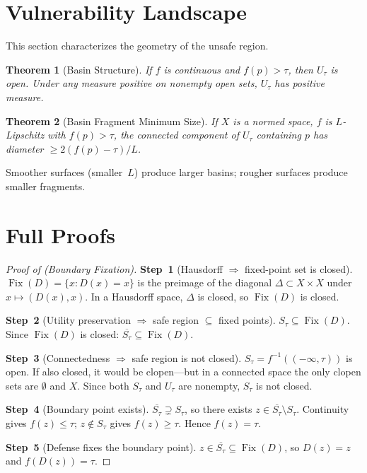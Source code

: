 \documentclass[11pt]{article}
\newtheorem{theorem}{Theorem}[section]
\newcommand{\cl}[1]{\overline{#1}}
\newcommand{\Fix}{\operatorname{Fix}}
\begin{document}
\section{Vulnerability Landscape}
\label{app:landscape}

This section characterizes the geometry of the unsafe region.

\begin{theorem}[Basin Structure]
\label{thm:basin}
If $f$ is continuous and $f(p)>\tau$, then $U_\tau$ is open. Under
any measure positive on nonempty open sets, $U_\tau$ has positive
measure.
\end{theorem}

\begin{theorem}[Basin Fragment Minimum Size]
\label{thm:fragment}
If $X$ is a normed space, $f$ is $L$-Lipschitz with $f(p) > \tau$,
the connected component of $U_\tau$ containing $p$ has diameter
$\geq 2(f(p) - \tau)/L$.
\end{theorem}

Smoother surfaces (smaller~$L$) produce larger basins; rougher
surfaces produce smaller fragments.

\section{Full Proofs}
\label{app:proofs}

\begin{proof}[Proof of  (Boundary Fixation)]
\textbf{Step~1} (Hausdorff $\Rightarrow$ fixed-point set is closed).
$\Fix(D) = \{x : D(x) = x\}$ is the preimage of the diagonal
$\Delta \subset X \times X$ under $x \mapsto (D(x), x)$. In a
Hausdorff space, $\Delta$ is closed, so $\Fix(D)$ is closed.

\textbf{Step~2} (Utility preservation $\Rightarrow$ safe region
$\subseteq$ fixed points).
$S_\tau \subseteq \Fix(D)$. Since $\Fix(D)$ is closed:
$\cl{S_\tau} \subseteq \Fix(D)$.

\textbf{Step~3} (Connectedness $\Rightarrow$ safe region is not closed).
$S_\tau = f^{-1}((-\infty,\tau))$ is open. If also closed, it would be
clopen---but in a connected space the only clopen sets are $\emptyset$
and $X$. Since both $S_\tau$ and $U_\tau$ are nonempty, $S_\tau$ is not
closed.

\textbf{Step~4} (Boundary point exists).
$\cl{S_\tau} \supsetneq S_\tau$, so there exists
$z \in \cl{S_\tau} \setminus S_\tau$. Continuity gives
$f(z) \leq \tau$; $z \notin S_\tau$ gives $f(z) \geq \tau$. Hence
$f(z) = \tau$.

\textbf{Step~5} (Defense fixes the boundary point).
$z \in \cl{S_\tau} \subseteq \Fix(D)$, so $D(z) = z$ and
$f(D(z)) = \tau$.
\end{proof}
\end{document}
